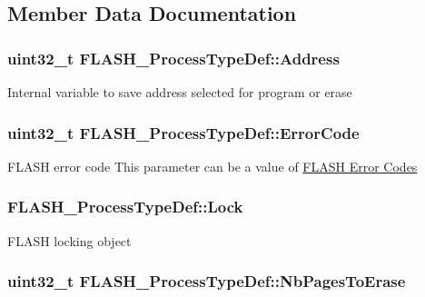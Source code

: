 \subsection{Member Data Documentation}
\hypertarget{struct_f_l_a_s_h___process_type_def_a680a9b907eb67c762b16ef7051cd8942}{
\subsubsection[{Address}]{ uint32\-\_\-t F\-L\-A\-S\-H\-\_\-\-Process\-Type\-Def\-::\-Address}}\label{struct_f_l_a_s_h___process_type_def_a680a9b907eb67c762b16ef7051cd8942}
Internal variable to save address selected for program or erase \hypertarget{struct_f_l_a_s_h___process_type_def_a8a6cc581b8b180090429d0a3c0ca0172}{
\subsubsection[{Error\-Code}]{ uint32\-\_\-t F\-L\-A\-S\-H\-\_\-\-Process\-Type\-Def\-::\-Error\-Code}}\label{struct_f_l_a_s_h___process_type_def_a8a6cc581b8b180090429d0a3c0ca0172}
F\-L\-A\-S\-H error code This parameter can be a value of \hyperlink{group___f_l_a_s_h___error___codes}{F\-L\-A\-S\-H Error Codes} \hypertarget{struct_f_l_a_s_h___process_type_def_ab5892cd1aacb0c0304b40f57023061e2}{
\subsubsection[{Lock}]{ F\-L\-A\-S\-H\-\_\-\-Process\-Type\-Def\-::\-Lock}}\label{struct_f_l_a_s_h___process_type_def_ab5892cd1aacb0c0304b40f57023061e2}
F\-L\-A\-S\-H locking object \hypertarget{struct_f_l_a_s_h___process_type_def_a0f55783c6dde84a998593cce2e08280b}{
\subsubsection[{Nb\-Pages\-To\-Erase}]{ uint32\-\_\-t F\-L\-A\-S\-H\-\_\-\-Process\-Type\-Def\-::\-Nb\-Pages\-To\-Erase}}\label{struct_f_l_a_s_h___process_type_def_a0f55783c6dde84a998593cce2e08280b}
